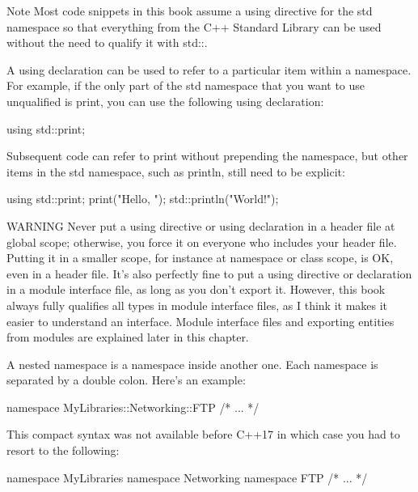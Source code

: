 \begin{myNotic}{Note}
Most code snippets in this book assume a using directive for the std namespace so that everything from the C++ Standard Library can be used without the need to qualify it with std::.
\end{myNotic}

A using declaration can be used to refer to a particular item within a namespace. For example, if the only part of the std namespace that you want to use unqualified is print, you can use the following using declaration:

\begin{cpp}
using std::print;
\end{cpp}

Subsequent code can refer to print without prepending the namespace, but other items in the std namespace, such as println, still need to be explicit:

\begin{cpp}
using std::print;
print("Hello, ");
std::println("World!");
\end{cpp}

\begin{myWarning}{WARNING}
Never put a using directive or using declaration in a header file at global scope; otherwise, you force it on everyone who includes your header file. Putting it in a smaller scope, for instance at namespace or class scope, is OK, even in a header file. It’s also perfectly fine to put a using directive or declaration in a module interface file, as long as you don’t export it. However, this book always fully qualifies all types in module interface files, as I think it makes it easier to understand an interface. Module interface files and exporting entities from modules are explained later in this chapter.
\end{myWarning}


A nested namespace is a namespace inside another one. Each namespace is separated by a double colon. Here’s an example:

\begin{cpp}
namespace MyLibraries::Networking::FTP {
    /* ... */
}
\end{cpp}

This compact syntax was not available before C++17 in which case you had to resort to the following:

\begin{cpp}
namespace MyLibraries {
    namespace Networking {
        namespace FTP {
            /* ... */
        }
    }
}
\end{cpp}

